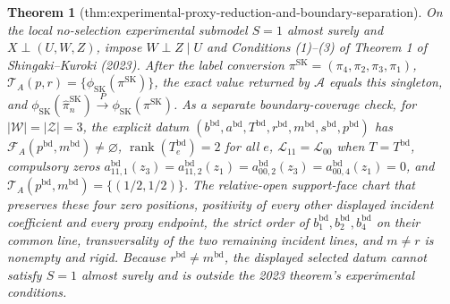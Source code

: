 \documentclass{article}
\newtheorem{theorem}{Theorem}
\begin{document}
\begin{theorem}[thm:experimental-proxy-reduction-and-boundary-separation]\label{thm:experimental-proxy-reduction-and-boundary-separation}
On the local no-selection experimental submodel \(S=1\) almost surely and \(X\perp(U,W,Z)\), impose \(W\perp Z\mid U\) and Conditions (1)--(3) of Theorem 1 of Shingaki--Kuroki (2023). After the label conversion \(\pi^{\mathrm{SK}}=(\pi_4,\pi_2,\pi_3,\pi_1)\), \(\mathcal T_A(p,r)=\{\phi_{\mathrm{SK}}(\pi^{\mathrm{SK}})\}\), the exact value returned by \(\mathscr A\) equals this singleton, and \(\phi_{\mathrm{SK}}(\widehat\pi_n^{\mathrm{SK}})\xrightarrow{P}\phi_{\mathrm{SK}}(\pi^{\mathrm{SK}})\). As a separate boundary-coverage check, for \(|\mathcal W|=|\mathcal Z|=3\), the explicit datum \((b^{\mathrm{bd}},a^{\mathrm{bd}},T^{\mathrm{bd}},r^{\mathrm{bd}},m^{\mathrm{bd}},s^{\mathrm{bd}},p^{\mathrm{bd}})\) has \(\mathcal F_A(p^{\mathrm{bd}},m^{\mathrm{bd}})\ne\varnothing\), \(\operatorname{rank}(T^{\mathrm{bd}}_e)=2\) for all \(e\), \(\mathcal L_{11}=\mathcal L_{00}\) when \(T=T^{\mathrm{bd}}\), compulsory zeros \(a^{\mathrm{bd}}_{11,1}(z_3)=a^{\mathrm{bd}}_{11,2}(z_1)=a^{\mathrm{bd}}_{00,2}(z_3)=a^{\mathrm{bd}}_{00,4}(z_1)=0\), and \(\mathcal T_A(p^{\mathrm{bd}},m^{\mathrm{bd}})=\{(1/2,1/2)\}\). The relative-open support-face chart that preserves these four zero positions, positivity of every other displayed incident coefficient and every proxy endpoint, the strict order of \(b_1^{\mathrm{bd}},b_2^{\mathrm{bd}},b_4^{\mathrm{bd}}\) on their common line, transversality of the two remaining incident lines, and \(m\ne r\) is nonempty and rigid. Because \(r^{\mathrm{bd}}\ne m^{\mathrm{bd}}\), the displayed selected datum cannot satisfy \(S=1\) almost surely and is outside the 2023 theorem's experimental conditions.
\end{theorem}
\end{document}
